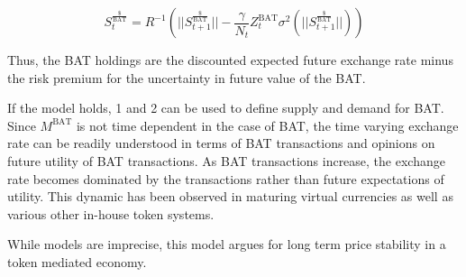 \documentclass[11pt]{article}
\begin{document}
\[\tag{2} S^{\frac{\$}{\textrm{BAT}}}_{t} = R^{-1} (||S^{\frac{\$}{\textrm{BAT}}}_{t+1}|| -\frac{\gamma}{N_t}Z^{\textrm{BAT}}_{t} \sigma^{2}(||S^{\frac{\$}{\textrm{BAT}}}_{t+1} ||) )\]
    
Thus, the \textrm{BAT} holdings are the discounted expected future exchange
rate minus the risk premium for the uncertainty in future value of the
\textrm{BAT}.

If the model holds, {1} and {2} can be used to define supply and
demand for \textrm{BAT}. Since $M^{\textrm{BAT}}$ is not time dependent in the case of \textrm{BAT}, the
time varying exchange rate can be readily understood in terms of \textrm{BAT}
transactions and opinions on future utility of \textrm{BAT} transactions. As
\textrm{BAT} transactions increase, the exchange rate becomes dominated by the
transactions rather than future expectations of utility. This dynamic
has been observed in maturing virtual currencies as well as various
other in-house token systems.

While models are imprecise, this model argues for long term price
stability in a token mediated economy. 

\printbibliography

\vspace*{\fill}

\begin{flushright}

\pdfcreationdate
\end{flushright}
\end{document}
